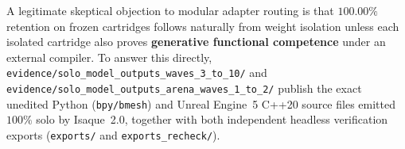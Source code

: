 \documentclass[10pt,a4paper]{article}
\begin{document}
A legitimate skeptical objection to modular adapter routing is that $100.00\%$ retention on frozen cartridges follows naturally from weight isolation unless each isolated cartridge also proves \textbf{generative functional competence} under an external compiler. To answer this directly, \texttt{evidence/solo\_\allowbreak{}model\_\allowbreak{}outputs\_\allowbreak{}waves\_\allowbreak{}3\_\allowbreak{}to\_\allowbreak{}10/} and \texttt{evidence/solo\_\allowbreak{}model\_\allowbreak{}outputs\_\allowbreak{}arena\_\allowbreak{}waves\_\allowbreak{}1\_\allowbreak{}to\_\allowbreak{}2/} publish the exact unedited Python (\texttt{bpy/bmesh}) and Unreal Engine~5 C++20 source files emitted $100\%$ solo by Isaque~2.0, together with both independent headless verification exports (\texttt{exports/} and \texttt{exports\_\allowbreak{}recheck/}).
\end{document}
